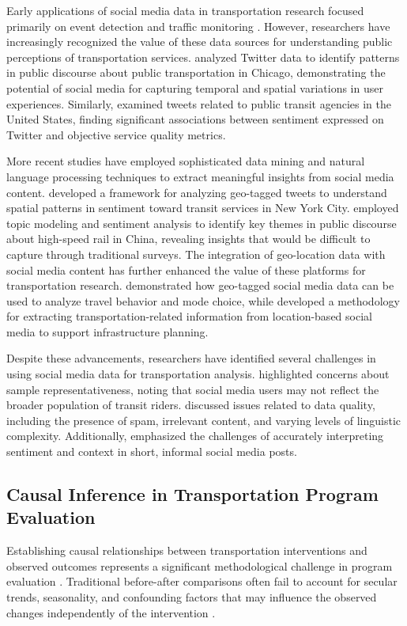 \documentclass[a4paper,fleqn,12pt]{cas-sc}
\begin{document}
Early applications of social media data in transportation research focused primarily on event detection and traffic monitoring \citep{steiger2015twitter, yuan2016discovering}. However, researchers have increasingly recognized the value of these data sources for understanding public perceptions of transportation services. \cite{collins2013social} analyzed Twitter data to identify patterns in public discourse about public transportation in Chicago, demonstrating the potential of social media for capturing temporal and spatial variations in user experiences. Similarly, \cite{schweitzer2012social} examined tweets related to public transit agencies in the United States, finding significant associations between sentiment expressed on Twitter and objective service quality metrics.

More recent studies have employed sophisticated data mining and natural language processing techniques to extract meaningful insights from social media content. \cite{zhang2019examining} developed a framework for analyzing geo-tagged tweets to understand spatial patterns in sentiment toward transit services in New York City. \cite{wang2020mining} employed topic modeling and sentiment analysis to identify key themes in public discourse about high-speed rail in China, revealing insights that would be difficult to capture through traditional surveys. The integration of geo-location data with social media content has further enhanced the value of these platforms for transportation research. \cite{rashidi2017exploring} demonstrated how geo-tagged social media data can be used to analyze travel behavior and mode choice, while \cite{maeda2019transportation} developed a methodology for extracting transportation-related information from location-based social media to support infrastructure planning.

Despite these advancements, researchers have identified several challenges in using social media data for transportation analysis. \cite{efthymiou2013use} highlighted concerns about sample representativeness, noting that social media users may not reflect the broader population of transit riders. \cite{nguyen2016transportation} discussed issues related to data quality, including the presence of spam, irrelevant content, and varying levels of linguistic complexity. Additionally, \cite{tse2018social} emphasized the challenges of accurately interpreting sentiment and context in short, informal social media posts.

\subsection{Causal Inference in Transportation Program Evaluation}
Establishing causal relationships between transportation interventions and observed outcomes represents a significant methodological challenge in program evaluation \citep{karner2016transportation, hong2020causal}. Traditional before-after comparisons often fail to account for secular trends, seasonality, and confounding factors that may influence the observed changes independently of the intervention \citep{lechner2011estimation, imbens2015causal}.
\end{document}
